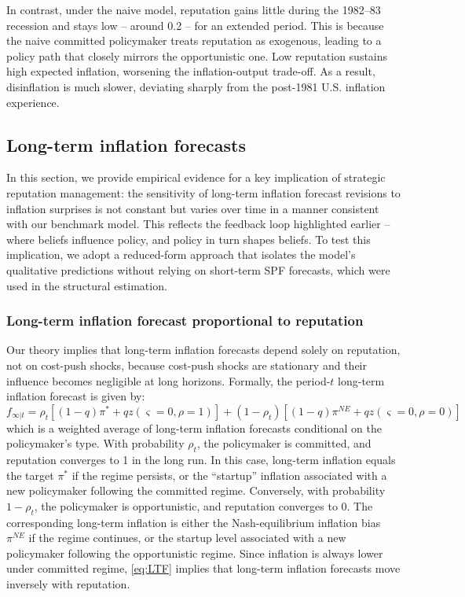 \documentclass[12pt,letter,leqno]{article}
\theoremstyle{asn}
\theoremstyle{lem}
\theoremstyle{slem}
\theoremstyle{prop}
\theoremstyle{appprop}
\theoremstyle{rem}
\theoremstyle{defn}
\begin{document}
In contrast, under the naive model, reputation gains little during the 1982–83 recession and stays low -- around 0.2 -- for an extended period. This is because the naive committed policymaker treats reputation as exogenous, leading to a policy path that closely mirrors the opportunistic one. Low reputation sustains high expected inflation, worsening the inflation-output trade-off. As a result, disinflation is much slower, deviating sharply from the post-1981 U.S. inflation experience.



\subsection{Long-term inflation forecasts}
In this section, we provide empirical evidence for a key implication of strategic reputation management: the sensitivity of long-term inflation forecast revisions to inflation surprises is not constant but varies over time in a manner consistent with our benchmark model. This reflects the feedback loop highlighted earlier -- where beliefs influence policy, and policy in turn shapes beliefs. To test this implication, we adopt a reduced-form approach that isolates the model’s qualitative predictions without relying on short-term SPF forecasts, which were used in the structural estimation.

\subsubsection{Long-term inflation forecast proportional to reputation}
Our theory implies that long-term inflation forecasts depend solely on reputation, not on cost-push shocks, because cost-push shocks are stationary and their influence becomes negligible at long horizons. Formally, the period-$t$ long-term inflation forecast is given by:
\begin{equation}\label{eq:LTF}
f_{\infty|t} = \rho_t[ (1 - q)\pi^* + qz(\varsigma = 0, \rho = 1)]+(1 - \rho_t)[(1-q)\pi^{NE}+qz(\varsigma = 0, \rho = 0)] 
\end{equation}
which is a weighted average of long-term inflation forecasts conditional on the policymaker’s type. With probability $\rho_t$, the policymaker is committed, and reputation converges to 1 in the long run. In this case, long-term inflation equals the target $\pi^*$ if the regime persists, or the “startup” inflation associated with a new policymaker following the committed regime. Conversely, with probability $1 - \rho_t$, the policymaker is opportunistic, and reputation converges to 0. The corresponding long-term inflation is either the Nash-equilibrium inflation bias $\pi^{NE}$ if the regime continues, or the startup level associated with a new policymaker following the opportunistic regime. Since inflation is always lower under committed regime, \eqref{eq:LTF} implies that long-term inflation forecasts move inversely with reputation. 
\end{document}
